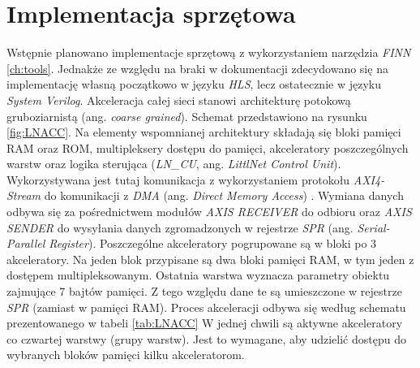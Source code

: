 \section{Implementacja sprzętowa}
Wstępnie planowano implementacje sprzętową z wykorzystaniem narzędzia \emph{FINN} \ref{ch:tools}.
Jednakże ze względu na braki w dokumentacji zdecydowano się na implementację własną początkowo w języku \emph{HLS}, lecz ostatecznie w języku \emph{System Verilog}.
Akceleracja całej sieci stanowi architekturę potokową gruboziarnistą (ang. \emph{coarse grained}).
Schemat przedstawiono na rysunku \ref{fig:LNACC}.
Na elementy wspomnianej architektury składają się bloki pamięci RAM oraz ROM, multipleksery dostępu do pamięci, akceleratory poszczególnych warstw oraz logika sterująca (\emph{LN\_CU}, ang. \emph{LittlNet Control Unit}).
Wykorzystywana jest tutaj komunikacja z wykorzystaniem protokołu \emph{AXI4-Stream} \cite{axis} do komunikacji z \emph{DMA} (ang. \emph{Direct Memory Access}) \cite{dma}.
Wymiana danych odbywa się za pośrednictwem  modułów \emph{AXIS RECEIVER} do odbioru oraz \emph{AXIS SENDER} do wysyłania danych zgromadzonych w rejestrze \emph{SPR} (ang. \emph{Serial-Parallel Register}).
Poszczególne akceleratory pogrupowane są w bloki po 3 akceleratory. 
Na jeden blok przypisane są dwa bloki pamięci RAM, w tym jeden z dostępem  multipleksowanym.
Ostatnia warstwa wyznacza parametry obiektu zajmujące 7 bajtów pamięci.
Z tego względu dane te są umieszczone w rejestrze \emph{SPR} (zamiast w pamięci RAM).
Proces akceleracji odbywa się według schematu prezentowanego w tabeli \ref{tab:LNACC}
W jednej chwili są aktywne akceleratory co czwartej warstwy (grupy warstw).
Jest to wymagane, aby udzielić dostępu do wybranych bloków pamięci kilku akceleratorom.
